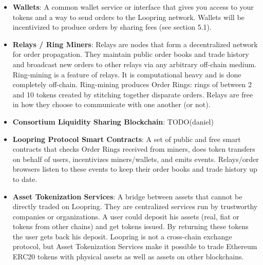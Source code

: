 \documentclass[UTF8,nofonts]{article}
\begin{document}
\begin{itemize}

\item \textbf{Wallets}: A common wallet service or interface that gives you access to your tokens and a way to send orders to the Loopring network. Wallets will be incentivized to produce orders by sharing fees (see section 5.1).

\item \textbf{Relays / Ring Miners}: Relays are nodes that form a decentralized network for order propagation. They maintain public order books and trade history and broadcast new orders to other relays via any arbitrary off-chain medium. Ring-mining is a feature of relays. It is computational heavy and is done completely off-chain. Ring-mining produces Order Rings: rings of between 2 and 10 tokens created by stitching together disparate orders. Relays are free in how they choose to communicate with one another (or not). 

\item \textbf{Consortium Liquidity Sharing Blockchain}: TODO(daniel)

\item \textbf{Loopring Protocol Smart Contracts}: A set of public and free smart contracts that checks Order Rings received from miners, does token transfers on behalf of users, incentivizes miners/wallets, and emits events. Relays/order browsers listen to these events to keep their order books and trade history up to date.

\item \textbf{Asset Tokenization Services}: A bridge between assets that cannot be directly traded on Loopring. They are centralized services run by trustworthy companies or organizations. A user could deposit his assets (real, fiat or tokens from other chains) and get tokens issued. By returning these tokens the user gets back his deposit. Loopring is not a cross-chain exchange protocol, but Asset Tokenization Services make it possible to trade Ethereum ERC20 tokens with physical assets as well as assets on other blockchains. 

\end{itemize}
\end{document}
